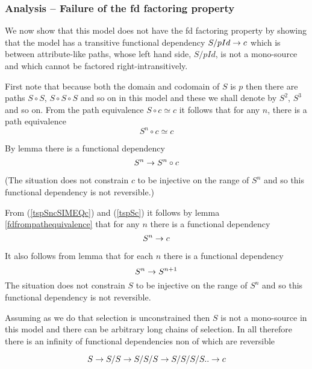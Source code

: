 \subsubsection{Analysis -- Failure of the fd factoring property}
We now show that this model does not have the fd factoring property by showing that
the model has a transitive functional dependency $S/pId \rightarrow c$ which is between
attribute-like paths, whose left hand side, $S/pId$, is not a mono-source and  which cannot be factored right-intransitively.

First note that because both the domain and  codomain of $S$ is $p$ then there are paths $S \circ S$, $S \circ S \circ S$ 
and so on in this model and these we shall denote by $S^2$, $S^3$ and so on. 
From the path equivalence $S \circ c \simeq c$ it follows that for any $n$, there is
a path equivalence 
\begin{equation}
\label{tspSncSIMEQc}
S^n \circ c \simeq c
\end{equation}

By lemma  there is a functional dependency
\begin{equation}
\label{tspSc}
S^n \rightarrow S^n \circ c
\end{equation}

(The situation does not constrain $c$ to be injective on the range of $S^n$ and so this functional dependency is not reversible.)

From (\ref{tspSncSIMEQc}) and (\ref{tspSc}) it follows by lemma \ref{fdfrompathequivalence} that for any $n$ there is a functional dependency
\begin{equation}
\label{tspSnc}
S^n \rightarrow c
\end{equation}


It also follows from lemma  that for each $n$ there is a functional dependency
\begin{equation}
\label{tspSnn1}
S^n \rightarrow S^{n+1}
\end{equation}
The situation does not constrain $S$ to be injective on the range of $S^n$ and so this functional dependency is not reversible.

Assuming as we do that selection is unconstrained then $S$ is not a mono-source in this model and there can be arbitrary long chains of selection.
In  all therefore there is an infinity of functional dependencies non of which are reversible

\begin{equation}
S \rightarrow S/S \rightarrow S/S/S \rightarrow S/S/S/S .. \rightarrow c
\end{equation}

